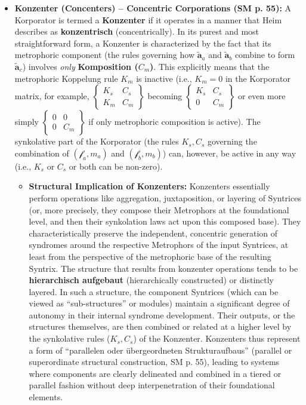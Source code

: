 \documentclass[12pt]{article}
\newcommand{\q}[1]{\enquote{#1}}
\newcommand{\metrophor}{\bm{\widetilde{a}}}
\newcommand{\synkolator}{\mathcal{f}}
\newcommand{\synkolationsstufe}{m}
\newcommand{\korporatoroperator}{\begin{Bmatrix} K_s & C_s \\ K_m & C_m \end{Bmatrix}}
\begin{document}
\begin{itemize}
    \item \textbf{Konzenter (Concenters) – Concentric Corporations (SM p. 55):}
    A Korporator is termed a \textbf{Konzenter} if it operates in a manner that Heim describes as \textbf{konzentrisch} (concentrically). In its purest and most straightforward form, a Konzenter is characterized by the fact that its metrophoric component (the rules governing how \( \metrophor_a \) and \( \metrophor_b \) combine to form \( \metrophor_c \)) involves \textit{only} \textbf{Komposition (\( C_m \))}. This explicitly means that the metrophoric Koppelung rule \( K_m \) is inactive (i.e., \( K_m = 0 \) in the Korporator matrix, for example, \( \korporatoroperator \) becoming \( \begin{Bmatrix} K_s & C_s \\ 0 & C_m \end{Bmatrix} \) or even more simply \( \begin{Bmatrix} 0 & 0 \\ 0 & C_m \end{Bmatrix} \) if only metrophoric composition is active). The synkolative part of the Korporator (the rules \( K_s, C_s \) governing the combination of \( (\synkolator_a, \synkolationsstufe_a) \) and \( (\synkolator_b, \synkolationsstufe_b) \)) can, however, be active in any way (i.e., \(K_s\) or \(C_s\) or both can be non-zero).
    \begin{itemize}
        \item \textbf{Structural Implication of Konzenters:} Konzenters essentially perform operations like aggregation, juxtaposition, or layering of Syntrices (or, more precisely, they compose their Metrophors at the foundational level, and then their synkolation laws act upon this composed base). They characteristically preserve the independent, concentric generation of syndromes around the respective Metrophors of the input Syntrices, at least from the perspective of the metrophoric base of the resulting Syntrix. The structure that results from konzenter operations tends to be \textbf{hierarchisch aufgebaut} (hierarchically constructed) or distinctly layered. In such a structure, the component Syntrices (which can be viewed as \q{sub-structures} or modules) maintain a significant degree of autonomy in their internal syndrome development. Their outputs, or the structures themselves, are then combined or related at a higher level by the synkolative rules (\( K_s, C_s \)) of the Konzenter. Konzenters thus represent a form of \q{parallelen oder übergeordneten Strukturaufbaus} (parallel or superordinate structural construction, SM p. 55), leading to systems where components are clearly delineated and combined in a tiered or parallel fashion without deep interpenetration of their foundational elements.
    \end{itemize}


\end{itemize}
\end{document}
